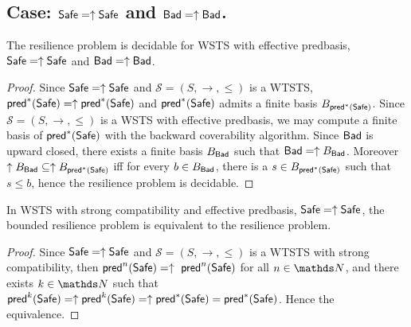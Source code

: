 \iffalse

\begin{proposition}\label{general}
\textcolor{red}{
$\mathscr{S}=(S,\rightarrow,\leq)$ is %
(\Bad,\Safe)-bounded-resilient iff $\mathscr{S}=(S,\rightarrow,\leq)$ is %
(\Bad,\Safe)-resilient (CONJECTURE FOR NOW)
}
\end{proposition}

\begin{proof}
Resilient means that ...
\end{proof}

\fi


\subsection{Case: $\textsf{Safe}=\uparrow \textsf{Safe}$ and $\textsf{Bad}=\uparrow \textsf{Bad}$.}




\begin{theorem}\label{up-up}
The resilience problem is decidable for WSTS with effective predbasis, $\textsf{Safe}=\uparrow \textsf{Safe}$
and $\textsf{Bad}=\uparrow \textsf{Bad}$.

\end{theorem}


\begin{proof}
Since $\textsf{Safe}=\uparrow \textsf{Safe}$ and
$\mathscr{S}=(S,\rightarrow,\leq)$ is a WTSTS,  $\textsf{pred}^*(\textsf{Safe})=\uparrow \textsf{pred}^*(\textsf{Safe})$ and $\textsf{pred}^*(\textsf{Safe})$ admits a finite basis $B_{\textsf{pred}^*(\textsf{Safe})}$. Since $\mathscr{S}=(S,\rightarrow,\leq)$ is a WSTS  with effective predbasis, we may compute a finite basis of $\textsf{pred}^*(\textsf{Safe})$ with the backward coverability algorithm. 
Since $\textsf{Bad}$  is upward closed, there exists a finite basis $B_{\textsf{Bad}}$ such that $\textsf{Bad} = \uparrow B_{\textsf{Bad}}$. Moreover $ \uparrow B_{\textsf{Bad}} \subseteq \uparrow B_{\textsf{pred}^*(\textsf{Safe})}$ iff for every $b \in B_{\textsf{Bad}}$, there is a $s \in B_{\textsf{pred}^*(\textsf{Safe})}$ such that $s \leq b$,
hence the resilience problem is decidable.
\end{proof}

\begin{proposition}
In WSTS with strong compatibility and effective predbasis,  $\textsf{Safe}=\uparrow \textsf{Safe}$, the bounded resilience problem is equivalent to the resilience problem.
\end{proposition}

\begin{proof}
Since $\textsf{Safe}=\uparrow \textsf{Safe}$ and
$\mathscr{S}=(S,\rightarrow,\leq)$ is a WTSTS with strong %
compatibility, then $\textsf{pred}^n(\textsf{Safe})= \uparrow~\textsf{pred}^n(\textsf{Safe})$ for all $n \in \N$,
and there exists $k \in \N$  such that 
$\textsf{pred}^k(\textsf{Safe}) = \uparrow \textsf{pred}^k(\textsf{Safe}) = \uparrow \textsf{pred}^*(\textsf{Safe}) = \textsf{pred}^*(\textsf{Safe})$.
Hence the equivalence.
\end{proof}

